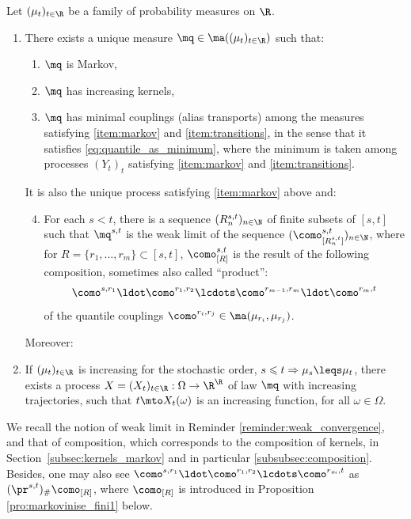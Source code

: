 \begin{themBJ}\label{them:a}
Let $(\mu_t)_{t\in\R}$ be a family of probability measures on $\R$.\begin{enumerate}
\item
\label{p1:them:a} There exists a unique measure $\mq\in \ma((\mu_t)_{t\in \R})$ such that:
\begin{enumerate}
\item
\label{item:markov}
$\mq$ is Markov,
\item
\label{item:transitions}
$\mq$ has increasing kernels,
\item\label{item:minimal}
$\mq$ has minimal couplings (alias transports) among the measures satisfying \eqref{item:markov} and \eqref{item:transitions}, in the sense that it satisfies \eqref{eq:quantile_as_minimum}, where the minimum is taken among processes $(Y_t)_t$ satisfying \eqref{item:markov} and \eqref{item:transitions}.
\end{enumerate}

\noindent It is also the unique process satisfying \eqref{item:markov} above and:
\begin{enumerate}
\setcounter{enumii}{3}
\item\label{item:limite_de_compose}
For each $s<t$, there is a sequence $(R^{s,t}_n)_{n\in \N}$ of finite subsets of $[s,t]$ such that $\mq^{s,t}$ is the weak limit of the sequence $(\como_{[R^{s,t}_n]}^{s,t})_{n\in \N}$, where for $R=\{r_1,\ldots,r_m\}\subset[s,t]$, $\como_{[R]}^{s,t}$
is the result of the following composition, sometimes also called ``product'':
\[\como^{s,r_1}{}\ldot\como^{r_1,r_2}\lcdots \como^{r_{m-1},r_m}{}\ldot\como^{r_{m},t}\]
of the quantile couplings $\como^{r_i,r_j}\in\ma(\mu_{r_i},\mu_{r_j})$.
\end{enumerate}

\noindent Moreover:

\item
\label{item:croissant} If $(\mu_t)_{t\in \R}$ is increasing for the stochastic order, \ie $s\leqslant t\Rightarrow\mu_s\leqs \mu_t$, there exists a process $X=(X_{t})_{t\in\R}:\Omega\to\R^\R$ of law $\mq$ with increasing trajectories, \ie such that $t\mto X_t(\omega)$ is an increasing function, for all $\omega\in\Omega$.
\end{enumerate}
\end{themBJ}

We recall the notion of weak limit in Reminder \ref{reminder:weak_convergence}, and that of composition, which corresponds to the composition of kernels, in Section~\ref{subsec:kernels_markov} and in particular \ref{subsubsec:composition}. Besides, one may also see $\como^{s,r_1}{}\ldot\como^{r_1,r_2}\lcdots \como^{r_{m},t}$ as $(\pr^{s,t})_\#\como_{[R]}$, where $\como_{[R]}$ is introduced in Proposition \ref{pro:markovinise_fini1} below.


